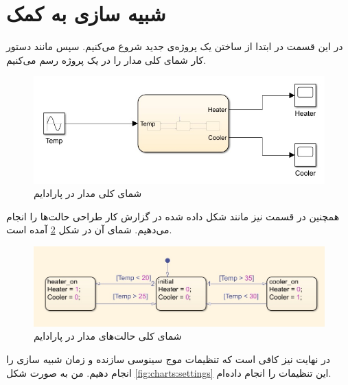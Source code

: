 \documentclass[]{article}
\begin{document}
\section{شبیه سازی به کمک }
در این قسمت در ابتدا از ساختن یک پروژه‌ی جدید شروع می‌کنیم. سپس مانند دستور کار شمای کلی مدار را
در یک پروژه رسم می‌کنیم.
\begin{figure}[H]
    \centering
    \includegraphics[scale=0.6]{pics/charts_schema1.jpg}
    \caption{شمای کلی مدار در پارادایم }
    \label{fig:charts:schema1}
\end{figure}
همچنین در قسمت
نیز مانند شکل داده شده در گزارش کار طراحی حالت‌ها را انجام می‌دهیم. شمای آن در شکل
\ref{fig:charts:schema2}
آمده است.
\begin{figure}[H]
    \centering
    \includegraphics[scale=0.6]{pics/charts_schema2.jpg}
    \caption{شمای کلی حالت‌های مدار در پارادایم }
    \label{fig:charts:schema2}
\end{figure}
در نهایت نیز کافی است که تنظیمات موج سینوسی سازنده و زمان شبیه سازی را انجام دهیم. من به صورت شکل
\ref{fig:charts:settings}
این تنظیمات را انجام داده‌ام.
\end{document}
